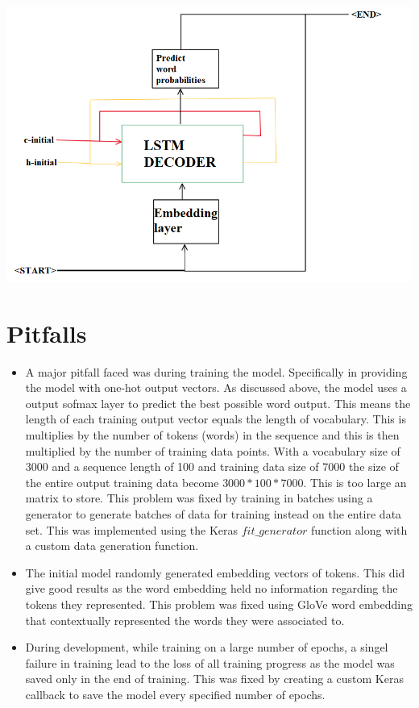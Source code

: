 \documentclass[12pt]{article}
\begin{document}
\begin{center}
\includegraphics[width=160mm]{inference.png}
\end{center}

\section*{Pitfalls}
\begin{itemize}
    \item A major pitfall faced was during training the model. Specifically in providing the model with one-hot output vectors. As discussed above, the model uses a output sofmax layer to predict the best possible word output. This means the length of each training output vector equals the length of vocabulary. This is multiplies by the number of tokens (words) in the sequence and this is then multiplied by the number of training data points. With a vocabulary size of 3000 and a sequence length of 100 and training data size of 7000 the size of the entire output training data become $3000*100*7000$. This is too large an matrix to store. This problem was fixed by training in batches using a generator to generate batches of data for training instead on the entire data set. This was implemented using the Keras $fit\_generator$ function along with a custom data generation function. 
    \item The initial model randomly generated embedding vectors of tokens. This did give good results as the word embedding held no information regarding the tokens they represented. This problem was fixed using GloVe word embedding that contextually represented the words they were associated to.
    \item During development, while training on a large number of epochs, a singel failure in training lead to the loss of all training progress as the model was saved only in the end of training. This was fixed by creating a custom Keras callback to save the model every specified number of epochs.
\end{itemize}
\end{document}
